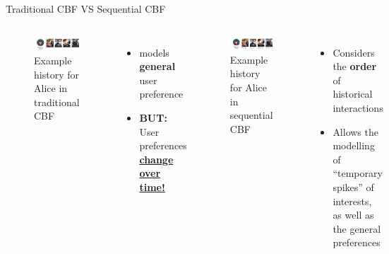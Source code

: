 \documentclass[en]{sdqbeamer}
\begin{document}
\begin{frame}{Traditional CBF VS Sequential CBF}
	\begin{columns}
		\begin{figure}
			\includegraphics[width=\textwidth]{images/Alice_history.pdf}
			\caption{Example history for Alice in traditional CBF \cite{channarongHybridBERT4RecHybridContentBased2022}}
		\end{figure}
		\begin{itemize}
			\item models \textbf{general} user preference
			\item \textbf{BUT:} User preferences \underline{\textbf{change over time!}} \cite{wangSequentialRecommenderSystems2019}
		\end{itemize}

		\begin{figure}
			\includegraphics[width=\textwidth]{images/Alice_seq.pdf}
			\caption{Example history for Alice in sequential CBF \cite{channarongHybridBERT4RecHybridContentBased2022}}
		\end{figure}
		\begin{itemize}
			\item Considers the \textbf{order} of historical interactions
			\item Allows the modelling of \enquote{temporary spikes} of interests, as well as the general preferences \cite{wangSequentialRecommenderSystems2019}
		\end{itemize}
	\end{columns}
\end{frame}
\end{document}
